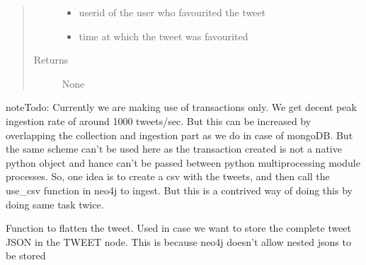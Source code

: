 \documentclass[letterpaper,10pt,english]{sphinxmanual}
\begin{document}
\begin{fulllineitems}
\begin{fulllineitems}
\begin{quote}
\begin{description}
\begin{itemize}
\item {} 
 \textendash{} userid of the user who favourited the tweet

\item {} 
 \textendash{} time at which the tweet was favourited

\end{itemize}

\item[{Returns}] \leavevmode
None

\end{description}\end{quote}

\begin{sphinxadmonition}{note}{Todo:}
Currently we are making use of transactions only. We get decent peak ingestion rate of
around 1000 tweets/sec. But this can be increased by overlapping the collection and ingestion part as
we do in case of mongoDB. But the same scheme can’t be used here as the transaction created is not
a native python object and hance can’t be passed between python multiprocessing module processes. So, one
idea is to create a csv with the tweets, and then call the use\_csv function in neo4j to ingest. But this is a
contrived way of doing this by doing same task twice.
\end{sphinxadmonition}

\end{fulllineitems}


\end{fulllineitems}


\begin{fulllineitems}
\label{\detokenize{neo4j_data_ingestion:ingest_neo4j_streaming.flatten_json}}
Function to flatten the tweet. Used in case we want to store the complete tweet JSON in the TWEET node.
This is because neo4j doesn’t allow nested jsons to be stored

\end{fulllineitems}


\begin{fulllineitems}
\label{\detokenize{neo4j_data_ingestion:ingest_neo4j_streaming.getDateFromTimestamp}}
\end{fulllineitems}
\end{document}
